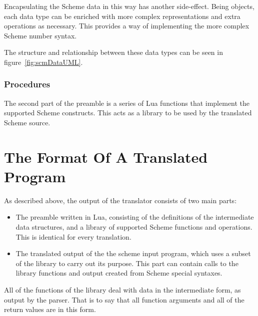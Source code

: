 Encapsulating the Scheme data in this way has another side-effect. Being
objects, each data type can be enriched with more complex representations and
extra operations as necessary. This provides a way of implementing the more
complex Scheme number syntax.

The structure and relationship between these data types
can be seen in figure~\ref{fig:scmDataUML}.

\subsubsection{Procedures}

The second part of the preamble is a series of Lua functions that implement the
supported Scheme constructs. This acts as a library to be used by the
translated Scheme source.


\section{The Format Of A Translated Program}

As described above, the output of the translator consists of two main parts:
\begin{itemize}
\item The preamble written in Lua, consisting of the definitions of the
intermediate data structures, and a library of supported Scheme functions and
operations.  This is identical for every translation.
\item The translated output of the the scheme input program, which uses a subset
of the library to carry out its purpose. This part can contain calls to the
library functions and output created from Scheme special syntaxes.
\end{itemize}

All of the functions of the library deal with data in the intermediate form, as
output by the parser. That is to say that all function arguments and all of the
return values are in this form.
